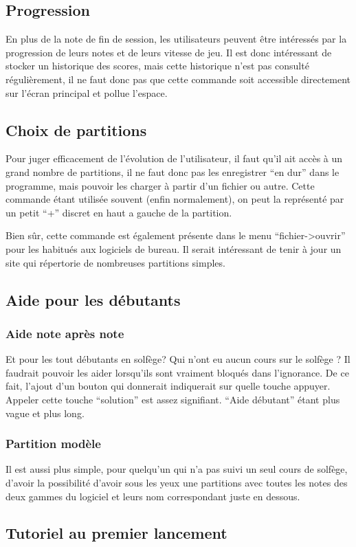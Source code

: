 \documentclass{article}
\begin{document}
\subsection{Progression}
En plus de la note de fin de session, les utilisateurs peuvent être intéressés par la progression de leurs notes et de leurs vitesse
de jeu. Il est donc intéressant de stocker un historique des scores, mais cette historique n'est pas consulté régulièrement, il ne 
faut donc pas que cette commande soit accessible directement sur l'écran principal et pollue l'espace.
\subsection{Choix de partitions}
Pour juger efficacement de l'évolution de l'utilisateur, il faut qu'il ait accès à un grand nombre de partitions, il ne faut donc 
pas les enregistrer ``en dur'' dans le programme, mais pouvoir les charger à partir d'un fichier ou autre. Cette commande étant utilisée
 souvent (enfin normalement), on peut la représenté par un petit ``+'' discret en haut a gauche de la partition.
 
 
 Bien sûr, cette commande est également présente dans le menu ``fichier->ouvrir'' pour les habitués aux logiciels de bureau.
 Il serait intéressant de tenir à jour un site qui répertorie de nombreuses partitions simples.
\subsection{Aide pour les débutants}
\subsubsection{Aide note après note}
Et pour les tout débutants en solfège? Qui n'ont eu aucun cours sur le solfège ? Il faudrait pouvoir les aider lorsqu'ils sont 
vraiment bloqués dans l'ignorance. De ce fait, l'ajout d'un bouton qui donnerait indiquerait sur quelle touche appuyer.
Appeler cette touche ``solution'' est assez signifiant. ``Aide débutant'' étant plus vague et plus long.
\subsubsection{Partition modèle}
Il est aussi plus simple, pour quelqu'un qui n'a pas suivi un seul cours de solfège, d'avoir la possibilité d'avoir sous les yeux une
partitions avec toutes les notes des deux gammes du logiciel et leurs nom correspondant juste en dessous.
\subsection{Tutoriel au premier lancement}
\end{document}
